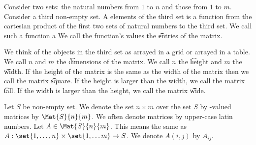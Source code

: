 
\sbasic





























\sstart
{}






Consider two sets: the natural numbers from
$1$ to $n$ and those from $1$ to $m$.
Consider a third non-empty set.
A  elements of the third set is a function from the cartesian product of the first two sets of natural numbers to the third set.
We call such a function a 
We call the function's values the \t{entries} of the matrix.

We think of the objects in the third set as arrayed in a grid or arrayed in a table.
We call $n$ and $m$ the \t{dimensions} of the matrix.
We call $n$ the \t{height} and $m$ the \t{width}.
If the height of the matrix is the same as the width of the matrix then we call the matrix \t{square}.
If the height is larger than the width, we call the matrix \t{tall}.
If the width is larger than the height, we call the matrix \t{wide}.


Let $S$ be non-empty set.
We denote the set $n \times m$ over
the set $S$ by -valued
matrices by $\Mat{S}{n}{m}$.
We often denote matrices by upper-case
latin numbers.
Let $A \in \Mat{S}{n}{m}$.
This means the same as
$A: \set{1, \dots, n} \times \set{1, \dots m} \to S$.
We denote $A(i, j)$ by $A_{ij}$.
\strats
